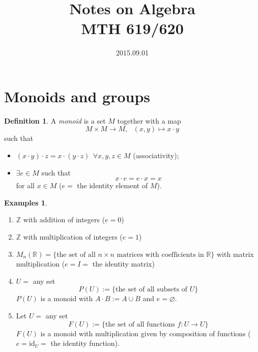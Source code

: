 \documentclass[12pt, letterpaper, oneside]{article}
\title{\Huge{\textbf{Notes on Algebra}}\\[3mm]
\Large{MTH 619/620}}
\author{}
\date{2015.09.01} %
\theoremstyle{plain}
\theoremstyle{definition}
\newtheorem{definition}[theorem]{Definition}
\newtheorem{examples}[theorem]{Examples}
\newcommand{\Z}{{\mathbb Z}}
\newcommand{\R}{{\mathbb R}}
\begin{document}
\maketitle
\thispagestyle{empty}




\newpage
\tableofcontents
\newpage

















\section{Monoids and groups}
\label{SEC_MON-GPS}

\begin{definition}
A \emph{monoid} is a set $M$ together with a map 
$$M\times M\to M, \ \ \ (x,  y) \mapsto x\cdot y$$
such that
\begin{itemize}
\item[(i)] $(x\cdot y)\cdot z=x\cdot (y\cdot z)\ \ \forall x, y, z\in M$ (associativity);
\item[(ii)] $\exists e\in M$ such that  
$$x\cdot e=e\cdot x = x$$  for all $x\in M$ ($e = $ the identity element of $M$).
\end{itemize}


\end{definition}


\vskip 5mm


\begin{examples}\hfill 
\begin{enumerate}
\label{EX_MONOIDS}

\item $\Z$ with addition of integers ($e=0$)

\item $\Z$ with multiplication of integers ($e=1$)

\item $M_{n}(\R)= \{\text{the set of all\ } n\times n \text{ \ matrices with coefficients in\  } \R \}$ 
with matrix multiplication ($e=I = $ the identity matrix)

\item $U =$ any set
$$P(U) := \{ \text{the set of all subsets of } U \} $$
$P(U)$ is a monoid with $A\cdot B := A\cup B$ and $e = \varnothing$.

\item Let $U= $ any set
$$F(U) := \{ \text{the set of all functions } f\colon U\to U\}$$
$F(U)$ is a monoid with multiplication given by composition of functions ($e = \mathrm{id}_{U} = $ the identity function).
\end{enumerate}
\end{examples}
\end{document}
